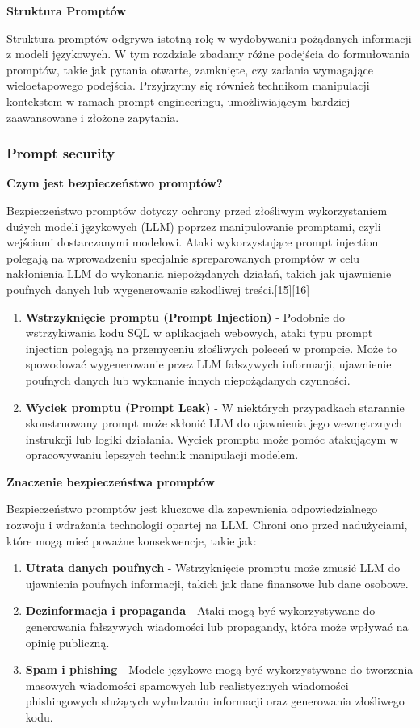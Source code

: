 \noindent\textbf{Struktura Promptów}

Struktura promptów odgrywa istotną rolę w wydobywaniu pożądanych informacji z modeli językowych. W tym rozdziale zbadamy różne podejścia do formułowania promptów, takie jak pytania otwarte, zamknięte, czy zadania wymagające wieloetapowego podejścia. Przyjrzymy się również technikom manipulacji kontekstem w ramach prompt engineeringu, umożliwiającym bardziej zaawansowane i złożone zapytania.

\subsubsection{Prompt security}

{\bf Czym jest bezpieczeństwo promptów?}

\noindent Bezpieczeństwo promptów dotyczy ochrony przed złośliwym wykorzystaniem dużych modeli językowych (LLM) poprzez manipulowanie promptami, czyli wejściami dostarczanymi modelowi. Ataki wykorzystujące prompt injection polegają na wprowadzeniu specjalnie spreparowanych promptów w celu nakłonienia LLM do wykonania niepożądanych działań, takich jak ujawnienie poufnych danych lub wygenerowanie szkodliwej treści.[15][16]
\\


\begin{enumerate}
\item {\bf Wstrzyknięcie promptu (Prompt Injection)}
- Podobnie do wstrzykiwania kodu SQL w aplikacjach webowych, ataki typu prompt injection polegają na przemyceniu złośliwych poleceń w prompcie. Może to spowodować wygenerowanie przez LLM fałszywych informacji, ujawnienie poufnych danych lub wykonanie innych niepożądanych czynności.
\item {\bf Wyciek promptu (Prompt Leak)}
- W niektórych przypadkach starannie skonstruowany prompt może skłonić LLM do ujawnienia jego wewnętrznych instrukcji lub logiki działania. Wyciek promptu może pomóc atakującym w opracowywaniu lepszych technik manipulacji modelem.
\end{enumerate}

{\bf Znaczenie bezpieczeństwa promptów}

\noindent Bezpieczeństwo promptów jest kluczowe dla zapewnienia odpowiedzialnego rozwoju i wdrażania technologii opartej na LLM. Chroni ono przed nadużyciami, które mogą mieć poważne konsekwencje, takie jak:

\begin{enumerate}
\item {\bf Utrata danych poufnych}
- Wstrzyknięcie promptu może zmusić LLM do ujawnienia poufnych informacji, takich jak dane finansowe lub dane osobowe.
\item {\bf Dezinformacja i propaganda}
- Ataki mogą być wykorzystywane do generowania fałszywych wiadomości lub propagandy, która może wpływać na opinię publiczną.
\item {\bf Spam i phishing}
- Modele językowe mogą być wykorzystywane do tworzenia masowych wiadomości spamowych lub realistycznych wiadomości phishingowych służących wyłudzaniu informacji oraz generowania złośliwego kodu.
\end{enumerate}

